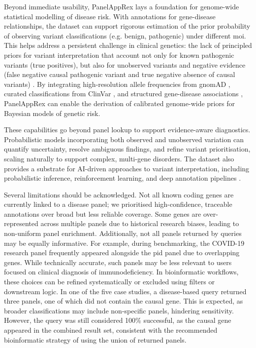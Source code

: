 Beyond immediate usability, PanelAppRex lays a foundation for genome-wide statistical modelling of disease risk. 
With annotations for gene-disease relationships, the dataset can support rigorous estimation of the prior probability of observing  variant classifications (e.g. benign, pathogenic) under different \ac{moi}.
This helps address a persistent challenge in clinical genetics: the lack of principled priors for variant interpretation that account not only for known pathogenic variants (true positives), but also for unobserved variants and negative evidence (false negative causal pathogenic variant and true negative absence of causal variants) \cite{hannah_using_2024, zschocke_mendelian_2023}. 
By integrating high-resolution allele frequencies from gnomAD \cite{karczewski2020mutational}, curated classifications from ClinVar \cite{landrum_clinvar_2018}, and structured gene-disease associations \cite{martin_panelapp_2019}, 
PanelAppRex can enable the derivation of calibrated genome-wide priors for Bayesian models of genetic risk.

These capabilities go beyond panel lookup to support evidence-aware diagnostics. 
Probabilistic models incorporating both observed and unobserved variation can quantify uncertainty, resolve ambiguous findings, and refine variant prioritisation, scaling naturally to support complex, multi-gene disorders. 
The dataset also provides a substrate for AI-driven approaches to variant interpretation, including probabilistic inference, reinforcement learning, and deep annotation pipelines
\cite{jumper_highly_2021, cheng_accurate_2023}.

Several limitations should be acknowledged. Not all known coding genes are currently linked to a disease panel; we prioritised high-confidence, traceable annotations over broad but less reliable coverage. 
Some genes are over-represented across multiple panels due to historical research biases, leading to non-uniform panel enrichment. 
Additionally, not all panels returned by queries may be equally informative. 
For example, during benchmarking, the COVID-19 research panel frequently appeared alongside the \ac{pid} panel due to overlapping genes. 
While technically accurate, such panels may be less relevant to users focused on clinical  diagnosis of immunodeficiency.
In bioinformatic workflows, these choices can be refined systematically or excluded using filters or downstream logic.
In one of the five case studies, a disease-based query returned three panels, one of which did not contain the causal gene. This is expected, as broader classifications may include non-specific panels, hindering sensitivity. However, the query was still considered 100\% successful, as the causal gene appeared in the combined result set, consistent with the recommended bioinformatic strategy of using the union of returned panels.

